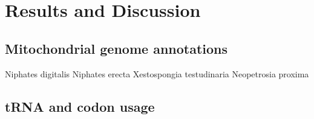\documentclass[../main.tex]{subfiles}
\begin{document}
\section{Results and Discussion}

\subsection{Mitochondrial genome annotations}
Niphates digitalis
Niphates erecta
Xestospongia testudinaria
Neopetrosia proxima

\subsection{tRNA and codon usage}
\end{document}
